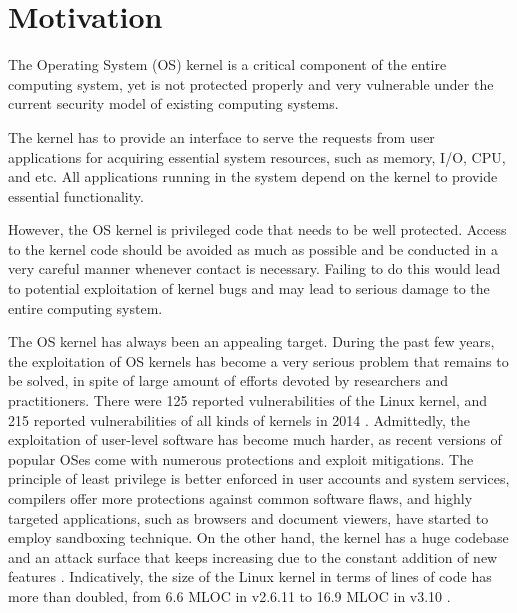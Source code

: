 \section{Motivation}
\label{sec.motivation}

The Operating System (OS) kernel is a critical component of the entire computing system, 
yet is not protected properly and very vulnerable under the current security model of existing 
computing systems.

The kernel has to provide an interface to serve the requests from user applications for acquiring 
essential system resources, such as memory, I/O, CPU, and etc. 
All applications running in the system depend on the kernel to provide 
essential functionality.   

However, the OS kernel is privileged code that needs to be well protected. Access to the
kernel code should be avoided as much as possible and be conducted in a very careful manner 
whenever contact is necessary. Failing to do this would lead to potential exploitation of kernel bugs and 
may lead to serious damage to the entire computing system.  

The OS kernel has always been an appealing target. During the past few years, 
the exploitation of OS kernels has become a very serious problem that remains to be solved, 
in spite of large amount of efforts devoted by researchers and practitioners. 
There were 125 reported vulnerabilities of the Linux kernel, and 215 reported vulnerabilities 
of all kinds of kernels in 2014 \cite{NVD:14}. Admittedly, the exploitation of user-level software 
has become much harder, as recent versions of popular OSes come with numerous protections 
and exploit mitigations. The principle of least privilege is better enforced in user accounts 
and system services, compilers offer more protections against common software flaws, 
and highly targeted applications, such as browsers and document viewers, have started to 
employ sandboxing technique. On the other hand, the kernel has a huge codebase and 
an attack surface that keeps increasing due to the constant addition of 
new features \cite{Metrics:13}. Indicatively, the size of the Linux kernel in terms of lines of code 
has more than doubled, from 6.6 MLOC in v2.6.11 to 16.9 MLOC in v3.10 \cite{Linux:13}.


